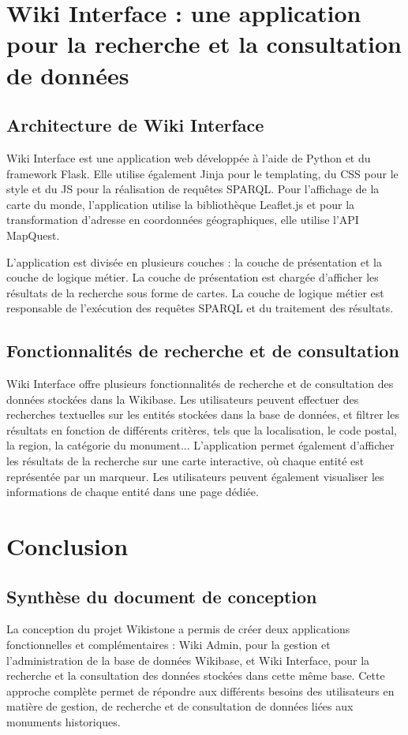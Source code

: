 \documentclass[a4paper, 12pt]{article}
\begin{document}
\section{Wiki Interface : une application pour la recherche et la consultation de données}
\subsection{Architecture de Wiki Interface}
Wiki Interface est une application web développée à l'aide de Python et du framework Flask. Elle utilise également Jinja pour le templating, du CSS pour le style et du JS pour la réalisation de requêtes SPARQL. Pour l'affichage de la carte du monde, l'application utilise la bibliothèque Leaflet.js et pour la transformation d'adresse en coordonnées géographiques, elle utilise l'API MapQuest.

L'application est divisée en plusieurs couches : la couche de présentation et la couche de logique métier. La couche de présentation est chargée d'afficher les résultats de la recherche sous forme de cartes. La couche de logique métier est responsable de l'exécution des requêtes SPARQL et du traitement des résultats.

\subsection{Fonctionnalités de recherche et de consultation}
Wiki Interface offre plusieurs fonctionnalités de recherche et de consultation des données stockées dans la Wikibase. Les utilisateurs peuvent effectuer des recherches textuelles sur les entités stockées dans la base de données, et filtrer les résultats en fonction de différents critères, tels que la localisation, le code postal, la region, la catégorie du monument... L'application permet également d'afficher les résultats de la recherche sur une carte interactive, où chaque entité est représentée par un marqueur. Les utilisateurs peuvent également visualiser les informations de chaque entité dans une page dédiée. 

\section{Conclusion}
\subsection{Synthèse du document de conception}


La conception du projet Wikistone a permis de créer deux applications fonctionnelles et complémentaires : Wiki Admin, pour la gestion et l'administration de la base de données Wikibase, et Wiki Interface, pour la recherche et la consultation des données stockées dans cette même base. Cette approche complète permet de répondre aux différents besoins des utilisateurs en matière de gestion, de recherche et de consultation de données liées aux monuments historiques.
\end{document}
